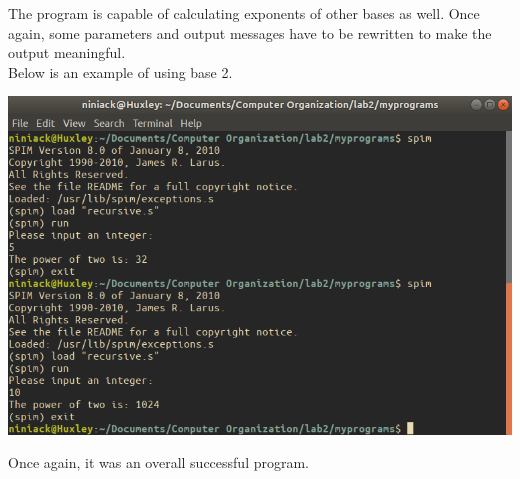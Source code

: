 \documentclass[twocolumn]{article}
\begin{document}
The program is capable of calculating exponents of other bases as well. Once again, some parameters and output messages have to be rewritten to make the output meaningful. \\

Below is an example of using base 2. 

\begin{center}
  \includegraphics[scale=0.45]{Lab2-images/recursive2.png}
\end{center}

Once again, it was an overall successful program. 






\printbibliography
\end{document}
